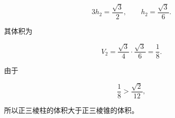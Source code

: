 \begin{answer}
\nopagebreak[4]
\[
3h_2=\frac{\sqrt3}{2},
\qquad h_2=\frac{\sqrt3}{6}.
\]

其体积为

\nopagebreak[4]
\[
V_2=\frac{\sqrt3}{4}\cdot\frac{\sqrt3}{6}=\frac18.
\]

由于

\nopagebreak[4]
\[
\frac18>\frac{\sqrt2}{12},
\]

所以正三棱柱的体积大于正三棱锥的体积。




\end{answer}